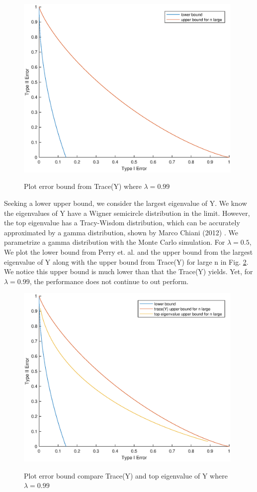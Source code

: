 \documentclass{article}
\begin{document}
\begin{figure}
    \centering
    {\includegraphics[width=11cm]{plot_traceY_lambda_99.eps} }
    \caption{ Plot error bound from Trace(Y) where $\lambda = 0.99$}
	\label{fig:plot_traceY_lambda_99}
\end{figure}

Seeking a lower upper bound, we consider the largest eigenvalue of Y. We know the eigenvalues of Y have a Wigner semicircle distribution in the limit. However, the top eigenvalue has a Tracy-Wisdom distribution, which can be accurately approximated by a gamma distribution, shown by Marco Chiani (2012) \cite{chiani} . We parametrize a gamma distribution with the Monte Carlo simulation. For $\lambda = 0.5$, We plot the lower bound from Perry et. al. \cite{perry} and the upper bound from the largest eigenvalue of Y along with the upper bound from Trace(Y) for large n in Fig. \ref{fig:plot_top_eigY_lambda_99}. We notice this upper bound is much lower than that the Trace(Y) yields. Yet, for $\lambda = 0.99$, the performance does not continue to out perform.


\begin{figure}
    \centering
    {\includegraphics[width=11cm]{plot_top_eigY_lambda_99.eps} }
    \caption{ Plot error bound compare Trace(Y) and top eigenvalue of Y where $\lambda = 0.99$}
	\label{fig:plot_top_eigY_lambda_99}
\end{figure}
\end{document}

